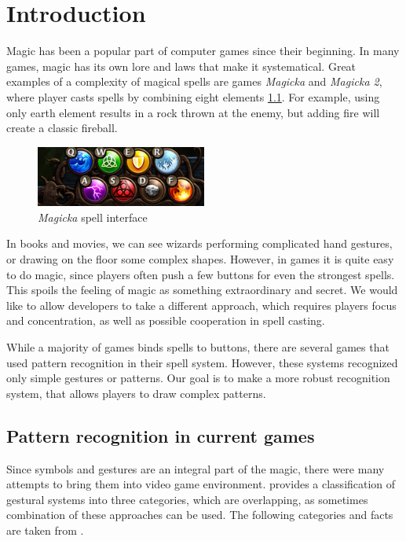 
\chapter{Introduction}
Magic has been a popular part of computer games since their beginning. In many games, magic has its own lore and laws that make it systematical. Great examples of a complexity of magical spells are games \emph{Magicka} and \emph{Magicka 2}, where player casts spells by combining eight elements \ref{fig:magicka}. For example, using only earth element results in a rock thrown at the enemy, but adding fire will create a classic fireball.
\begin{figure}[!htb]
  \centering
  \includegraphics[width=0.5\textwidth]{ext/magicka.png}
  \caption{\emph{Magicka} spell interface}
  \label{fig:magicka}
\end{figure}

In books and movies, we can see wizards performing complicated hand gestures, or drawing on the floor some complex shapes. However, in games it is quite easy to do magic, since players often push a few buttons for even the strongest spells. This spoils the feeling of magic as something extraordinary and secret. We would like to allow developers to take a different approach, which requires players focus and concentration, as well as possible cooperation in spell casting.

While a majority of games binds spells to buttons, there are several games that used pattern recognition in their spell system. However, these systems recognized only simple gestures or patterns. Our goal is to make a more robust recognition system, that allows players to draw complex patterns.

\section{Pattern recognition in current games}

Since symbols and gestures are an integral part of the magic, there were many attempts to bring them into video game environment. \citet{gameMagic} provides a classification of gestural systems into three categories, which are overlapping, as sometimes combination of these approaches can be used. The following categories and facts are taken from \citet{gameMagic}.

